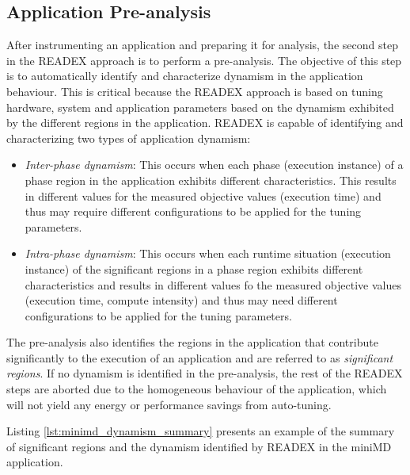 \subsection{Application Pre-analysis}
\label{sec:dynamism_detection}
After instrumenting an application and preparing it for analysis, the second step in the READEX approach is to perform a pre-analysis. The objective of this step is to automatically identify and characterize dynamism in the application behaviour. This is critical because the READEX approach is based on tuning hardware, system and application parameters based on the dynamism exhibited by the different regions in the application. READEX is capable of identifying and characterizing two types of application dynamism:
\begin{itemize}
  \item \textit{Inter-phase dynamism}: This occurs when each phase (execution instance) of a phase region in the application exhibits different characteristics. This results in different values for the measured objective values (execution time) and thus may require different configurations to be applied for the tuning parameters.
  \item \textit{Intra-phase dynamism}: This occurs when each runtime situation (execution instance) of the significant regions in a phase region exhibits different characteristics and results in different values fo the measured objective values (execution time, compute intensity) and thus may need different configurations to be applied for the tuning parameters.
\end{itemize}
The pre-analysis also identifies the regions in the application that contribute significantly to the execution of an application and are referred to as \textit{significant regions}. If no dynamism is identified in the pre-analysis, the rest of the READEX steps are aborted due to the homogeneous behaviour of the application, which will not yield any energy or performance savings from auto-tuning.

Listing \ref{lst:minimd_dynamism_summary} presents an example of the summary of significant regions and the dynamism identified by READEX in the miniMD application.

